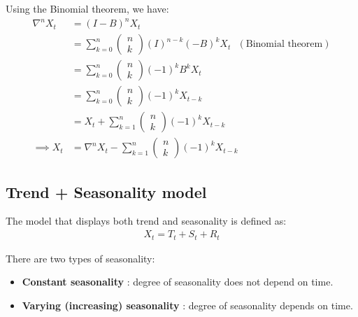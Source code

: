 \begin{proof*}
    Using the Binomial theorem, we have:
    \begin{align*}
        \nabla^n X_t 
            &= (I-B)^n X_t \\
            &= \sum_{k=0}^n \begin{pmatrix} n \\ k \end{pmatrix} (I)^{n-k}(-B)^k X_t \ \ \ (\text{Binomial theorem}) \\
            &= \sum_{k=0}^n \begin{pmatrix} n \\ k \end{pmatrix} (-1)^k B^kX_t \\
            &= \sum_{k=0}^n \begin{pmatrix} n \\ k \end{pmatrix} (-1)^k X_{t-k} \\
            &= X_t + \sum_{k=1}^n \begin{pmatrix} n \\ k \end{pmatrix} (-1)^k X_{t-k} \\
            \implies X_t &= \nabla^n X_t - \sum_{k=1}^n \begin{pmatrix} n \\ k \end{pmatrix} (-1)^k X_{t-k}
    \end{align*}
\end{proof*}

\subsection{Trend + Seasonality model}
\begin{definition}
    The model that displays both trend and seasonality is defined as:
    \begin{align*}
        X_t = T_t + S_t + R_t
    \end{align*}

    \noindent There are two types of seasonality:
    \begin{itemize}
        \item \textbf{Constant seasonality} : degree of seasonality does not depend on time.
        \item \textbf{Varying (increasing) seasonality} : degree of seasonality depends on time.
    \end{itemize}
\end{definition}

